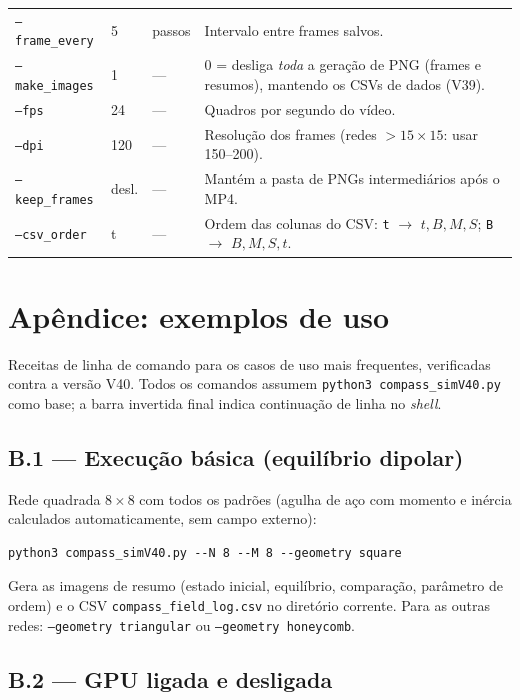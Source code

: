 \documentclass[11pt,a4paper]{article}
\newcommand{\code}[1]{\texttt{#1}}
\begin{document}
\begin{longtable}{@{}lll p{7.6cm}@{}}
\code{--frame\_every} & 5 & passos & Intervalo entre frames salvos. \\
\code{--make\_images} & 1 & --- & 0 = desliga \emph{toda} a geração de
PNG (frames e resumos), mantendo os CSVs de dados (V39). \\
\code{--fps} & 24 & --- & Quadros por segundo do vídeo. \\
\code{--dpi} & 120 & --- & Resolução dos frames (redes $>15\times15$:
usar 150--200). \\
\code{--keep\_frames} & desl. & --- & Mantém a pasta de PNGs
intermediários após o MP4. \\
\code{--csv\_order} & t & --- & Ordem das colunas do CSV: \code{t}
$\to$ $t,B,M,S$; \code{B} $\to$ $B,M,S,t$. \\
\end{longtable}
\endgroup

\section{Apêndice: exemplos de uso}
\label{app:exemplos}

Receitas de linha de comando para os casos de uso mais frequentes,
verificadas contra a versão V40. Todos os comandos assumem
\code{python3 compass\_simV40.py} como base; a barra invertida final
indica continuação de linha no \emph{shell}.

\subsection*{B.1 --- Execução básica (equilíbrio dipolar)}

Rede quadrada $8\times8$ com todos os padrões (agulha de aço com
momento e inércia calculados automaticamente, sem campo externo):
\begin{verbatim}
python3 compass_simV40.py --N 8 --M 8 --geometry square
\end{verbatim}
Gera as imagens de resumo (estado inicial, equilíbrio, comparação,
parâmetro de ordem) e o CSV \code{compass\_field\_log.csv} no diretório
corrente. Para as outras redes: \code{--geometry triangular} ou
\code{--geometry honeycomb}.

\subsection*{B.2 --- GPU ligada e desligada}
\end{document}
